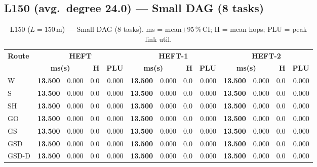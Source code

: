 \documentclass[11pt]{article}
\newcommand{\win}[1]{\textcolor{green!50!black}{\textbf{#1}}}
\begin{document}
\subsection{L150 (avg.\ degree 24.0) --- Small DAG (8 tasks)}
\begin{table}[H]\centering\small
\begin{tabular}{l r@{$\pm$}l r r r@{$\pm$}l r r r@{$\pm$}l r r}
\toprule
\textbf{Route} & \multicolumn{4}{c}{\textbf{HEFT}} & \multicolumn{4}{c}{\textbf{HEFT-1}} & \multicolumn{4}{c}{\textbf{HEFT-2}} \\
\cmidrule(lr){2-5}\cmidrule(lr){6-9}\cmidrule(lr){10-13}
& \multicolumn{2}{c}{\textbf{ms(s)}} & \textbf{H} & \textbf{PLU}& \multicolumn{2}{c}{\textbf{ms(s)}} & \textbf{H} & \textbf{PLU}& \multicolumn{2}{c}{\textbf{ms(s)}} & \textbf{H} & \textbf{PLU} \\
\midrule
  W & \win{13.500} & 0.000 & 0.0 & 0.000 & \win{13.500} & 0.000 & 0.0 & 0.000 & \win{13.500} & 0.000 & 0.0 & 0.000 \\
  S & \win{13.500} & 0.000 & 0.0 & 0.000 & \win{13.500} & 0.000 & 0.0 & 0.000 & \win{13.500} & 0.000 & 0.0 & 0.000 \\
  SH & \win{13.500} & 0.000 & 0.0 & 0.000 & \win{13.500} & 0.000 & 0.0 & 0.000 & \win{13.500} & 0.000 & 0.0 & 0.000 \\
  GO & \win{13.500} & 0.000 & 0.0 & 0.000 & \win{13.500} & 0.000 & 0.0 & 0.000 & \win{13.500} & 0.000 & 0.0 & 0.000 \\
  GS & \win{13.500} & 0.000 & 0.0 & 0.000 & \win{13.500} & 0.000 & 0.0 & 0.000 & \win{13.500} & 0.000 & 0.0 & 0.000 \\
  GSD & \win{13.500} & 0.000 & 0.0 & 0.000 & \win{13.500} & 0.000 & 0.0 & 0.000 & \win{13.500} & 0.000 & 0.0 & 0.000 \\
  GSD-D & \win{13.500} & 0.000 & 0.0 & 0.000 & \win{13.500} & 0.000 & 0.0 & 0.000 & \win{13.500} & 0.000 & 0.0 & 0.000 \\
\bottomrule\end{tabular}
\caption{L150 ($L=150$\,m) --- Small DAG (8 tasks). ms = mean$\pm$95\,\%\,CI; H = mean hops; PLU = peak link util.}
\end{table}
\end{document}
